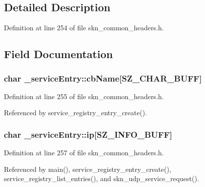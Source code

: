 \subsection{Detailed Description}


Definition at line 254 of file skn\+\_\+common\+\_\+headers.\+h.



\subsection{Field Documentation}
\subsubsection[{\texorpdfstring{cb\+Name}{cbName}}]{\setlength{\rightskip}{0pt plus 5cm}char \+\_\+service\+Entry\+::cb\+Name\mbox{[}{\bf S\+Z\+\_\+\+C\+H\+A\+R\+\_\+\+B\+U\+FF}\mbox{]}}\hypertarget{struct__service_entry_ac654e9e33bf977ee6c36c46af83fbdd4}{}\label{struct__service_entry_ac654e9e33bf977ee6c36c46af83fbdd4}


Definition at line 255 of file skn\+\_\+common\+\_\+headers.\+h.



Referenced by service\+\_\+registry\+\_\+entry\+\_\+create().

\subsubsection[{\texorpdfstring{ip}{ip}}]{\setlength{\rightskip}{0pt plus 5cm}char \+\_\+service\+Entry\+::ip\mbox{[}{\bf S\+Z\+\_\+\+I\+N\+F\+O\+\_\+\+B\+U\+FF}\mbox{]}}\hypertarget{struct__service_entry_a70b1db0895fbe31c07c8799cb57c678a}{}\label{struct__service_entry_a70b1db0895fbe31c07c8799cb57c678a}


Definition at line 257 of file skn\+\_\+common\+\_\+headers.\+h.



Referenced by main(), service\+\_\+registry\+\_\+entry\+\_\+create(), service\+\_\+registry\+\_\+list\+\_\+entries(), and skn\+\_\+udp\+\_\+service\+\_\+request().

